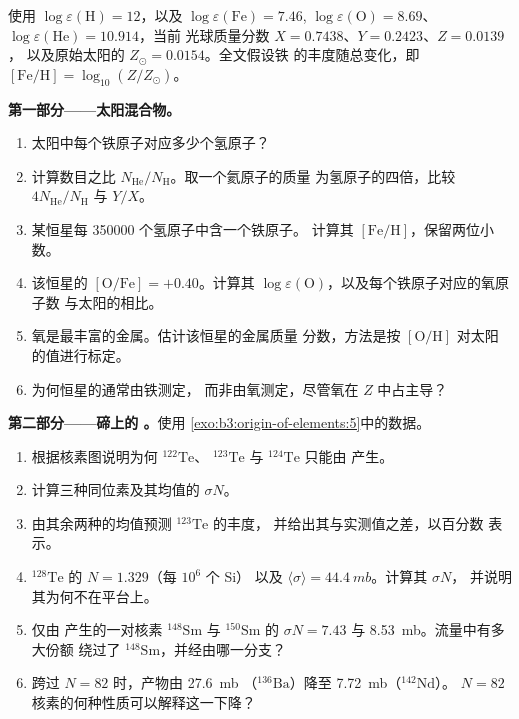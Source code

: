 \begin{problem}
\label{pb:b3:origin-of-elements:1}
使用 $\log\varepsilon(\mathrm{H}) = 12$，以及
$\log\varepsilon(\mathrm{Fe}) = 7.46$, $\log\varepsilon(\mathrm{O}) =
8.69$、$\log\varepsilon(\mathrm{He}) = 10.914$，当前
光球质量分数 $X = 0.7438$、$Y = 0.2423$、$Z = 0.0139$，
以及原始太阳的 $Z_\odot = 0.0154$。全文假设铁
的丰度随总变化，即 $[\mathrm{Fe/H}] = \log_{10}(Z/Z_\odot)$。

\medskip\noindent\textbf{第一部分——太阳混合物。}
\begin{enumerate}
\item 太阳中每个铁原子对应多少个氢原子？
\item 计算数目之比 $N_\mathrm{He}/N_\mathrm{H}$。取一个氦原子的质量
  为氢原子的四倍，比较
  $4N_\mathrm{He}/N_\mathrm{H}$ 与 $Y/X$。
\item 某恒星每 \num{350000} 个氢原子中含一个铁原子。
  计算其 $[\mathrm{Fe/H}]$，保留两位小数。
\item 该恒星的 $[\mathrm{O/Fe}] = +0.40$。计算其
  $\log\varepsilon(\mathrm{O})$，以及每个铁原子对应的氧原子数
  与太阳的相比。
\item 氧是最丰富的金属。估计该恒星的金属质量
  分数，方法是按 $[\mathrm{O/H}]$ 对太阳的值进行标定。
\item 为何恒星的通常由铁测定，
  而非由氧测定，尽管氧在 $Z$ 中占主导？
\end{enumerate}

\medskip\noindent\textbf{第二部分——碲上的 。}使用
\cref{exo:b3:origin-of-elements:5}中的数据。
\begin{enumerate}[resume]
\item 根据核素图说明为何 $^{122}\mathrm{Te}$、
  $^{123}\mathrm{Te}$ 与 $^{124}\mathrm{Te}$ 只能由 产生。
\item 计算三种同位素及其均值的 $\sigma N$。
\item 由其余两种的均值预测 $^{123}\mathrm{Te}$ 的丰度，
  并给出其与实测值之差，以百分数
  表示。
\item $^{128}\mathrm{Te}$ 的 $N = 1.329$（每 $10^6$ 个 Si）
  以及 $\langle\sigma\rangle = \qty{44.4}{mb}$。计算其 $\sigma N$，
  并说明其为何不在平台上。
\item 仅由 产生的一对核素 $^{148}\mathrm{Sm}$ 与 $^{150}\mathrm{Sm}$ 的
  $\sigma N = \num{7.43}$ 与 \qty{8.53}{mb}。流量中有多大份额
  绕过了 $^{148}\mathrm{Sm}$，并经由哪一分支？
\item 跨过 $N = 82$ 时，产物由 \qty{27.6}{mb}
  （$^{136}\mathrm{Ba}$）降至 \qty{7.72}{mb}（$^{142}\mathrm{Nd}$）。
  $N = 82$ 核素的何种性质可以解释这一下降？
\end{enumerate}


\end{problem}
